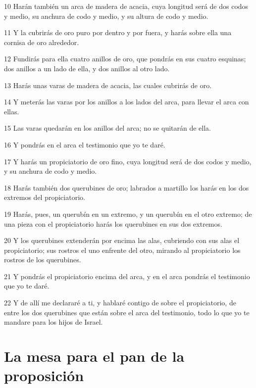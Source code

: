 \par 10 Harán también un arca de madera de acacia, cuya longitud será de dos codos   y medio, su anchura de codo y medio, y su altura de codo y medio.
\par 11 Y la cubrirás de oro puro por dentro y por fuera, y harás sobre ella una cornisa de oro alrededor.
\par 12 Fundirás para ella cuatro anillos de oro, que pondrás en sus cuatro esquinas; dos anillos a un lado de ella, y dos anillos al otro lado.
\par 13 Harás unas varas de madera de acacia, las cuales cubrirás de oro.
\par 14 Y meterás las varas por los anillos a los lados del arca, para llevar el arca con ellas.
\par 15 Las varas quedarán en los anillos del arca; no se quitarán de ella.
\par 16 Y pondrás en el arca el testimonio que yo te daré.
\par 17 Y harás un propiciatorio de oro fino, cuya longitud será de dos codos   y medio, y su anchura de codo y medio.
\par 18 Harás también dos querubines de oro; labrados a martillo los harás en los dos extremos del propiciatorio.
\par 19 Harás, pues, un querubín en un extremo, y un querubín en el otro extremo; de una pieza con el propiciatorio harás los querubines en sus dos extremos.
\par 20 Y los querubines extenderán por encima las alas, cubriendo con sus alas el propiciatorio; sus rostros el uno enfrente del otro, mirando al propiciatorio los rostros de los querubines.
\par 21 Y pondrás el propiciatorio encima del arca, y en el arca pondrás el testimonio que yo te daré.
\par 22 Y de allí me declararé a ti, y hablaré contigo de sobre el propiciatorio, de entre los dos querubines que están sobre el arca del testimonio, todo lo que yo te mandare para los hijos de Israel.

\section*{La mesa para el pan de la proposición}

